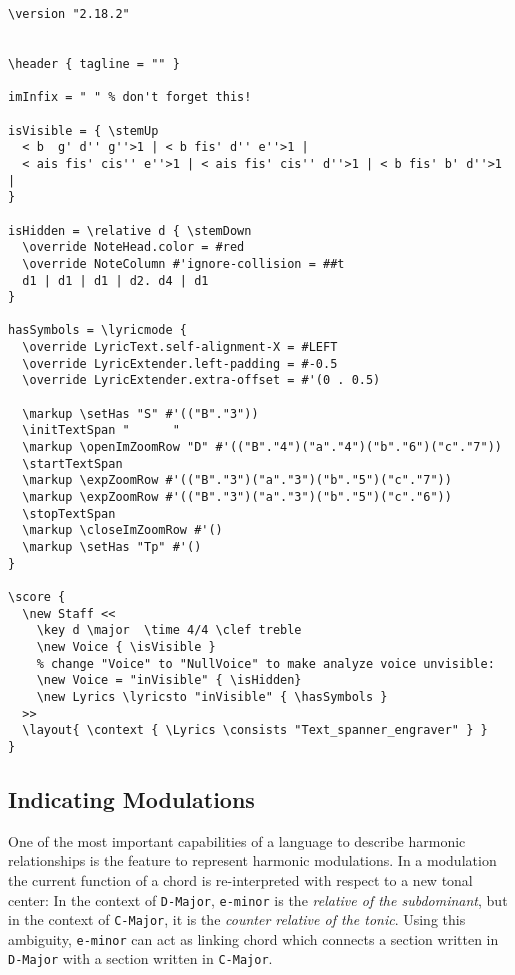 \documentclass[
  DIV=calc,
  BCOR=5mm,
  12pt,
  headings=small,
  oneside,
  abstract=true,
  toc=bib,
  xcolor=dvipsnames,
  openany,
  ngerman,english]{scrartcl}
\newcommand{\acc}[0]{\textit}
\begin{document}
\begin{scriptsize}
\begin{verbatim}
\version "2.18.2"


\header { tagline = "" }

imInfix = " " % don't forget this!

isVisible = { \stemUp 
  < b  g' d'' g''>1 | < b fis' d'' e''>1 | 
  < ais fis' cis'' e''>1 | < ais fis' cis'' d''>1 | < b fis' b' d''>1 |
}

isHidden = \relative d { \stemDown 
  \override NoteHead.color = #red
  \override NoteColumn #'ignore-collision = ##t
  d1 | d1 | d1 | d2. d4 | d1
}

hasSymbols = \lyricmode {
  \override LyricText.self-alignment-X = #LEFT
  \override LyricExtender.left-padding = #-0.5
  \override LyricExtender.extra-offset = #'(0 . 0.5)

  \markup \setHas "S" #'(("B"."3"))
  \initTextSpan "      "
  \markup \openImZoomRow "D" #'(("B"."4")("a"."4")("b"."6")("c"."7"))
  \startTextSpan
  \markup \expZoomRow #'(("B"."3")("a"."3")("b"."5")("c"."7")) 
  \markup \expZoomRow #'(("B"."3")("a"."3")("b"."5")("c"."6")) 
  \stopTextSpan 
  \markup \closeImZoomRow #'()    
  \markup \setHas "Tp" #'() 
}

\score {
  \new Staff <<
    \key d \major  \time 4/4 \clef treble
    \new Voice { \isVisible }
    % change "Voice" to "NullVoice" to make analyze voice unvisible:
    \new Voice = "inVisible" { \isHidden}
    \new Lyrics \lyricsto "inVisible" { \hasSymbols }
  >>
  \layout{ \context { \Lyrics \consists "Text_spanner_engraver" } }
} 

\end{verbatim}
\end{scriptsize}

\subsection{Indicating Modulations}

One of the most important capabilities of a language to describe harmonic
relationships is the feature to represent harmonic modulations. In a modulation
the current function of a chord is re-interpreted with respect to a new tonal
center: In the context of \texttt{D-Major}, \texttt{e-minor} is the
\acc{relative of the subdominant}, but in the context of \texttt{C-Major}, it is
the \acc{counter relative of the tonic}. Using this ambiguity, \texttt{e-minor}
can act as linking chord which connects a section written in \texttt{D-Major}
with a section written in \texttt{C-Major}.
\end{document}
